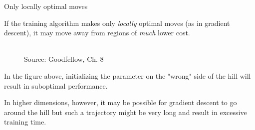 \begin{frame} {Only locally optimal moves}
  \begin{itemize}
  \small{
    \item If the training algorithm makes only \textit{locally} optimal moves (as in gradient descent), it may move away from regions of \textit{much} lower cost.
      \begin{figure}
    \centering
      \tiny{\\Source: Goodfellow, Ch. 8}
    \end{figure}
    \item In the figure above, initializing the parameter on the "wrong" side of the hill will result in suboptimal performance.
    \item In higher dimensions, however, it may be possible for gradient descent to go around the hill but such a trajectory might be very long and result in excessive training time.}
  \end{itemize}
\end{frame}


